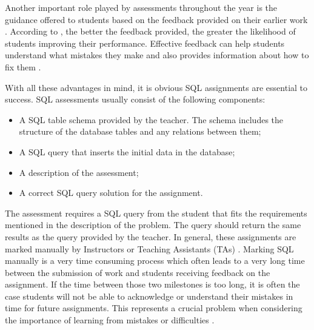 Another important role played by assessments throughout the year is the guidance offered to students based on the feedback provided on their earlier work \citep{literature:assement}. According to \cite{literature:assement}, the better the feedback provided, the greater the likelihood of students improving their performance. Effective feedback can help students understand what mistakes they make and also provides information about how to fix them \citep{literature:assement}.

With all these advantages in mind, it is obvious SQL assignments are essential to success. SQL assessments usually consist of the following components:
\begin{itemize}
    \item A SQL table schema provided by the teacher. The schema includes
    the structure of the database tables and any relations between them;
    \item A SQL query that inserts the initial data in the database;
    \item A description of the assessment;
    \item A correct SQL query solution for the
    assignment.
\end{itemize}

The assessment requires a SQL query from the student that fits the requirements mentioned in the description of the problem. The query should return the same results as the query provided by the teacher. In general, these assignments are marked manually by Instructors or Teaching Assistants (TAs) \citep{literature:xdata}. Marking SQL manually is a very time consuming process which often leads to a very long time between the submission of work and students receiving feedback on the assignment. If the time between those two milestones is too long, it is often the case students will not be able to acknowledge or understand their mistakes in time for future assignments. This represents a crucial problem when considering the importance of learning from mistakes or difficulties \citep{literature:assement}.

